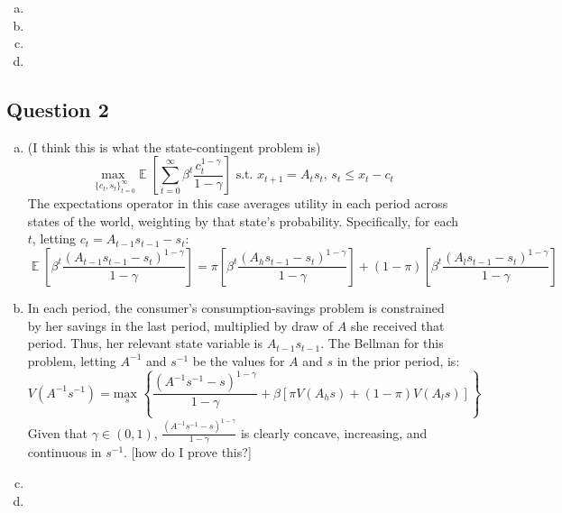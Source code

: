 \documentclass{article}
\newcommand{\usmax}[1]{\underset{#1}{\text{max }}}
\newcommand{\zinf}{_{t=0}^\infty}
\newcommand{\aneg}{A^{-1}}
\newcommand{\sneg}{s^{-1}}
\DeclareMathOperator{\E}{\mathbb{E}} %
\begin{document}
\begin{enumerate}[(a)]
	\item 
	
	\item 
	
	\item 
	
	\item 
	
\end{enumerate}

\subsection*{Question 2}

\begin{enumerate}[(a)]
	\item (I think this is what the state-contingent problem is)
		\[
			\usmax{\{c_t,s_t\}\zinf}\E\left[\sum\zinf\beta^t\frac{c_t^{1-\gamma}}{1-\gamma}\right]\text{ s.t. }x_{t+1}= A_ts_t\text{, }s_t\leq x_t-c_t
		\]
		The expectations operator in this case averages utility in each period across states of the world, weighting by that state's probability. Specifically, for each $t$, letting $c_t = A_{t-1}s_{t-1} - s_t$:
		\[
			\E\left[\beta^t\frac{(A_{t-1}s_{t-1} - s_t)^{1-\gamma}}{1-\gamma}\right] = \pi\left[\beta^t\frac{(A_hs_{t-1} - s_t)^{1-\gamma}}{1-\gamma}\right] + (1-\pi)\left[\beta^t\frac{(A_ls_{t-1} - s_t)^{1-\gamma}}{1-\gamma}\right] 
		\]
		
	\item In each period, the consumer's consumption-savings problem is constrained by her savings in the last period, multiplied by draw of $A$ she received that period. Thus, her relevant state variable is $A_{t-1}s_{t-1}$. The Bellman for this problem, letting $A^{-1}$ and $s^{-1}$ be the values for $A$ and $s$ in the prior period, is:
		\[
			V(A^{-1}s^{-1}) = \usmax{s}\left\{ \frac{\left(\aneg\sneg-s\right)^{1-\gamma}}{1-\gamma} + \beta\left[\pi V(A_hs) + (1-\pi)V(A_ls)\right] \right\}
		\]
		Given that $\gamma\in(0,1)$, $\frac{\left(\aneg\sneg-s\right)^{1-\gamma}}{1-\gamma}$ is clearly concave, increasing, and continuous in $\sneg$. [how do I prove this?]
	
	\item 
	
	\item 
	
\end{enumerate}

\end{document}
